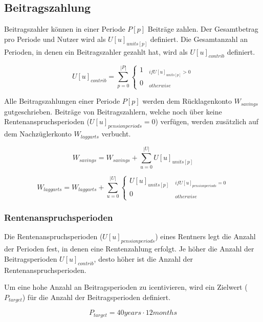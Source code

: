 \subsection{Beitragszahlung}

Beitragszahler können in einer Periode $P[p]$ Beiträge zahlen. Der Gesamtbetrag pro Periode und Nutzer wird als $U[u]_{units[p]}$ definiert. Die Gesamtanzahl an Perioden, in denen ein Beitragszahler gezahlt hat, wird als $U[u]_{contrib}$ definiert.

\begin{equation}
U[u]_{contrib} = \sum_{p=0}^{|P|} \begin{cases} 
1 & _{if U[u]_{units[p]} > 0} \\
0 & _{otherwise}
\end{cases}
\end{equation}


Alle Beitragszahlungen einer Periode $P[p]$ werden dem Rücklagenkonto  $W_{savings}$ gutgeschrieben.
Beiträge von Beitragszahlern, welche noch über keine Rentenanspruchsperioden ($U[u]_{pensionperiods} = 0$) verfügen, werden zusätzlich auf dem Nachzüglerkonto $W_{laggarts}$ verbucht.

\begin{equation}
W_{savings} = W_{savings} + \sum_{u=0}^{|U|} U[u]_{units[p]}
\end{equation}


\begin{dmath}
W_{laggarts} = W_{laggarts} + \sum_{u=0}^{|U|} \begin{cases} 
U[u]_{units[p]} & _{if U[u]_{pensionperiods} = 0} \\
0 & _{otherwise}
\end{cases}
\end{dmath}

\subsubsection{Rentenanspruchsperioden}
Die Rentenanspruchsperioden ($U[u]_{pensionperiods}$) eines Rentners legt die Anzahl der Perioden fest,
in denen eine Rentenzahlung erfolgt. Je höher die Anzahl der Beitragsperioden
$U[u]_{contrib}$, desto höher ist die Anzahl der Rentenanspruchsperioden.

Um eine hohe Anzahl an Beitragsperioden zu icentivieren, wird ein Zielwert ($P_{target}$)
für die Anzahl der Beitragsperioden definiert. 

\begin{equation}
	P_{target} = 40 years \cdot 12 months
\end{equation}

